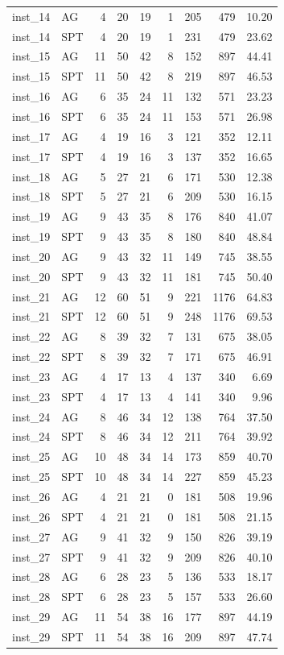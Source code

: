 \begin{longtable}{@{}llrrrrrrr@{}}
inst\_14 & AG & 4 & 20 & 19 & 1 & 205 & 479 & 10.20 \\
inst\_14 & SPT & 4 & 20 & 19 & 1 & 231 & 479 & 23.62 \\
inst\_15 & AG & 11 & 50 & 42 & 8 & 152 & 897 & 44.41 \\
inst\_15 & SPT & 11 & 50 & 42 & 8 & 219 & 897 & 46.53 \\
inst\_16 & AG & 6 & 35 & 24 & 11 & 132 & 571 & 23.23 \\
inst\_16 & SPT & 6 & 35 & 24 & 11 & 153 & 571 & 26.98 \\
inst\_17 & AG & 4 & 19 & 16 & 3 & 121 & 352 & 12.11 \\
inst\_17 & SPT & 4 & 19 & 16 & 3 & 137 & 352 & 16.65 \\
inst\_18 & AG & 5 & 27 & 21 & 6 & 171 & 530 & 12.38 \\
inst\_18 & SPT & 5 & 27 & 21 & 6 & 209 & 530 & 16.15 \\
inst\_19 & AG & 9 & 43 & 35 & 8 & 176 & 840 & 41.07 \\
inst\_19 & SPT & 9 & 43 & 35 & 8 & 180 & 840 & 48.84 \\
inst\_20 & AG & 9 & 43 & 32 & 11 & 149 & 745 & 38.55 \\
inst\_20 & SPT & 9 & 43 & 32 & 11 & 181 & 745 & 50.40 \\
inst\_21 & AG & 12 & 60 & 51 & 9 & 221 & 1176 & 64.83 \\
inst\_21 & SPT & 12 & 60 & 51 & 9 & 248 & 1176 & 69.53 \\
inst\_22 & AG & 8 & 39 & 32 & 7 & 131 & 675 & 38.05 \\
inst\_22 & SPT & 8 & 39 & 32 & 7 & 171 & 675 & 46.91 \\
inst\_23 & AG & 4 & 17 & 13 & 4 & 137 & 340 & 6.69 \\
inst\_23 & SPT & 4 & 17 & 13 & 4 & 141 & 340 & 9.96 \\
inst\_24 & AG & 8 & 46 & 34 & 12 & 138 & 764 & 37.50 \\
inst\_24 & SPT & 8 & 46 & 34 & 12 & 211 & 764 & 39.92 \\
inst\_25 & AG & 10 & 48 & 34 & 14 & 173 & 859 & 40.70 \\
inst\_25 & SPT & 10 & 48 & 34 & 14 & 227 & 859 & 45.23 \\
inst\_26 & AG & 4 & 21 & 21 & 0 & 181 & 508 & 19.96 \\
inst\_26 & SPT & 4 & 21 & 21 & 0 & 181 & 508 & 21.15 \\
inst\_27 & AG & 9 & 41 & 32 & 9 & 150 & 826 & 39.19 \\
inst\_27 & SPT & 9 & 41 & 32 & 9 & 209 & 826 & 40.10 \\
inst\_28 & AG & 6 & 28 & 23 & 5 & 136 & 533 & 18.17 \\
inst\_28 & SPT & 6 & 28 & 23 & 5 & 157 & 533 & 26.60 \\
inst\_29 & AG & 11 & 54 & 38 & 16 & 177 & 897 & 44.19 \\
inst\_29 & SPT & 11 & 54 & 38 & 16 & 209 & 897 & 47.74 \\

\end{longtable}
\endgroup


